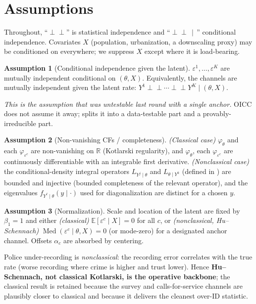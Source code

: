 \documentclass[11pt]{article}
\theoremstyle{definition}
\newtheorem{assumption}{Assumption}
\newcommand{\R}{\mathbb{R}}
\newcommand{\E}{\mathbb{E}}
\newcommand{\ind}{\perp\!\!\!\perp}
\newcommand{\Th}{\theta}
\newcommand{\lat}{\Th}
\begin{document}
\section{Assumptions}\label{sec:assump}

Throughout, ``$\ind$'' is statistical independence and ``$\ind\,\mid\,$''
conditional independence. Covariates $X$ (population, urbanization, a
downscaling proxy) may be conditioned on everywhere; we suppress $X$ except
where it is load-bearing.

\begin{assumption}[Conditional independence given the latent]\label{A1}
$\varepsilon^{1},\dots,\varepsilon^{K}$ are mutually independent conditional
on $(\lat,X)$. Equivalently, the channels are mutually independent given the
latent rate: $Y^{1}\ind\cdots\ind Y^{K}\mid(\lat,X)$.
\end{assumption}

\noindent\emph{This is the assumption that was untestable last round with a
single anchor.} OICC does not assume it away;  splits it into
a data-testable part and a provably-irreducible part.

\begin{assumption}[Non-vanishing CFs / completeness]\label{A2}
\emph{(Classical case)} $\varphi_{\lat}$ and each $\varphi_{\varepsilon^c}$ are
non-vanishing on $\R$ (Kotlarski regularity), and $\varphi_{\lat}$, each
$\varphi_{\varepsilon^c}$ are continuously differentiable with an integrable
first derivative.\;
\emph{(Nonclassical case)} the conditional-density integral operators
$L_{Y^j\mid\lat}$ and $L_{\lat\mid Y^k}$ (defined in ) are
bounded and injective (bounded completeness of the relevant operator), and the
eigenvalues $f_{Y^\ell\mid\lat}(y\mid\cdot)$ used for diagonalization are
distinct for a chosen $y$.
\end{assumption}

\begin{assumption}[Normalization]\label{A3}
Scale and location of the latent are fixed by
$\beta_1=1$ and either \emph{(classical)} $\E[\varepsilon^c\mid X]=0$ for all
$c$, or \emph{(nonclassical, Hu--Schennach)}
$\operatorname{Med}(\varepsilon^{c}\mid\lat,X)=0$ (or mode-zero) for a
designated anchor channel. Offsets $\alpha_c$ are absorbed by centering.
\end{assumption}

\noindent Police under-recording is \emph{nonclassical}: the recording error
correlates with the true rate (worse recording where crime is higher and trust
lower). Hence \textbf{Hu--Schennach, not classical Kotlarski, is the operative
backbone}; the classical result is retained because the survey and
calls-for-service channels are plausibly closer to classical and because it
delivers the cleanest over-ID statistic.
\end{document}
